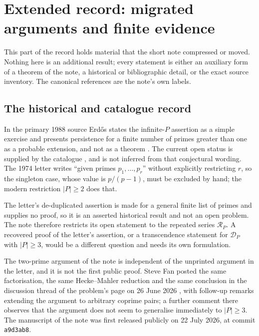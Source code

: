 \section{Extended record: migrated arguments and finite evidence}
\label{long269:long:extended}

This part of the record holds material that the short note compressed or moved.
Nothing here is an additional result; every statement is either an auxiliary
form of a theorem of the note, a historical or bibliographic detail, or the
exact source inventory.  The canonical references are the note's own labels.

\subsection{The historical and catalogue record}\label{long269:long:history}

In the primary 1988 source Erd\H{o}s states the infinite-$P$ assertion as a
simple exercise and presents persistence for a finite number of primes greater
than one as a probable extension, and not as a theorem
\cite[p.~106]{erdos1988}.  The current open status is supplied by the
catalogue \cite{erdosproblems}, and is not inferred from that conjectural
wording.  The 1974 letter writes ``given primes $p_1,\ldots,p_r$'' without
explicitly restricting $r$, so the singleton case, whose value is $p/(p-1)$,
must be excluded by hand; the modern restriction $|P|\ge2$ does that.

The letter's de-duplicated assertion is made for a general finite list of
primes and supplies no proof, so it is an asserted historical result and not an
open problem.  The note therefore restricts its open statement to the repeated
series $\mathcal R_P$.  A recovered proof of the letter's assertion, or a
transcendence statement for $\mathcal D_P$ with $|P|\ge3$, would be a different
question and needs its own formulation.

The two-prime argument of the note is independent of the unprinted argument in
the letter, and it is not the first public proof.  Steve Fan posted the same
factorisation, the same Hecke--Mahler reduction and the same conclusion in the
discussion thread of the problem's page on 26 June 2026
\cite{fan2026comment}, with follow-up remarks extending the argument to
arbitrary coprime pairs; a further comment there observes that the argument
does not seem to generalise immediately to $|P|\ge3$.  The manuscript of the
note was first released publicly on 22 July 2026, at commit \texttt{a9d3ab8}.


